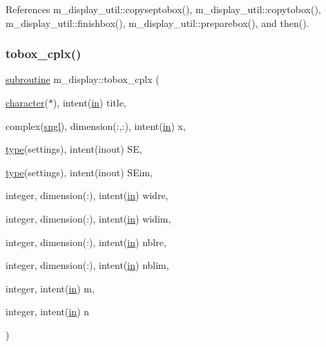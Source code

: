 References m\+\_\+display\+\_\+util\+::copyseptobox(), m\+\_\+display\+\_\+util\+::copytobox(), m\+\_\+display\+\_\+util\+::finishbox(), m\+\_\+display\+\_\+util\+::preparebox(), and then().

\mbox{\label{namespacem__display_a95571f3e4015bb187bcc1785c76013f9}} 
\subsubsection{\texorpdfstring{tobox\+\_\+cplx()}{tobox\_cplx()}}
{\footnotesize\ttfamily \hyperlink{M__stopwatch_83_8txt_acfbcff50169d691ff02d4a123ed70482}{subroutine} m\+\_\+display\+::tobox\+\_\+cplx (\begin{DoxyParamCaption}\item[{\hyperlink{option__stopwatch_83_8txt_abd4b21fbbd175834027b5224bfe97e66}{character}($\ast$), intent(\hyperlink{M__journal_83_8txt_afce72651d1eed785a2132bee863b2f38}{in})}]{title,  }\item[{complex(\hyperlink{namespacem__display_a2ac86bc535c3ccc5947dbb3109c666b5}{sngl}), dimension(\+:,\+:), intent(\hyperlink{M__journal_83_8txt_afce72651d1eed785a2132bee863b2f38}{in})}]{x,  }\item[{\hyperlink{stop__watch_83_8txt_a70f0ead91c32e25323c03265aa302c1c}{type}(settings), intent(inout)}]{SE,  }\item[{\hyperlink{stop__watch_83_8txt_a70f0ead91c32e25323c03265aa302c1c}{type}(settings), intent(inout)}]{S\+Eim,  }\item[{integer, dimension(\+:), intent(\hyperlink{M__journal_83_8txt_afce72651d1eed785a2132bee863b2f38}{in})}]{widre,  }\item[{integer, dimension(\+:), intent(\hyperlink{M__journal_83_8txt_afce72651d1eed785a2132bee863b2f38}{in})}]{widim,  }\item[{integer, dimension(\+:), intent(\hyperlink{M__journal_83_8txt_afce72651d1eed785a2132bee863b2f38}{in})}]{nblre,  }\item[{integer, dimension(\+:), intent(\hyperlink{M__journal_83_8txt_afce72651d1eed785a2132bee863b2f38}{in})}]{nblim,  }\item[{integer, intent(\hyperlink{M__journal_83_8txt_afce72651d1eed785a2132bee863b2f38}{in})}]{m,  }\item[{integer, intent(\hyperlink{M__journal_83_8txt_afce72651d1eed785a2132bee863b2f38}{in})}]{n }\end{DoxyParamCaption})\hspace{0.3cm}{\ttfamily [private]}}



